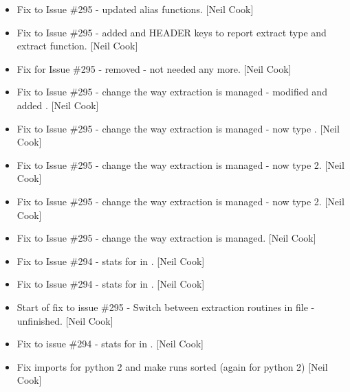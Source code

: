 \documentclass[a4paper,10pt,english]{report}
\begin{document}
\begin{itemize}
\item {} 
Fix to Issue \#295 - updated alias functions. {[}Neil Cook{]}

\item {} 
Fix to Issue \#295 - added  and  HEADER keys to
report extract type and extract function. {[}Neil Cook{]}

\item {} 
Fix for Issue \#295 - removed  - not needed any
more. {[}Neil Cook{]}

\item {} 
Fix to Issue \#295 - change the way extraction is managed - modified
 and added . {[}Neil Cook{]}

\item {} 
Fix to Issue \#295 - change the way extraction is managed - now type
. {[}Neil Cook{]}

\item {} 
Fix to Issue \#295 - change the way extraction is managed - now type 2.
{[}Neil Cook{]}

\item {} 
Fix to Issue \#295 - change the way extraction is managed - now type 2.
{[}Neil Cook{]}

\item {} 
Fix to Issue \#295 - change the way extraction is managed. {[}Neil Cook{]}

\item {} 
Fix to Issue \#294 - stats for  in .
{[}Neil Cook{]}

\item {} 
Fix to Issue \#294 - stats for  in .
{[}Neil Cook{]}

\item {} 
Start of fix to issue \#295 - Switch between extraction routines in
 file - unfinished. {[}Neil Cook{]}

\item {} 
Fix to issue \#294 - stats for  in .
{[}Neil Cook{]}

\item {} 
Fix imports for python 2 and make runs sorted (again for python 2)
{[}Neil Cook{]}


\end{itemize}
\end{document}
